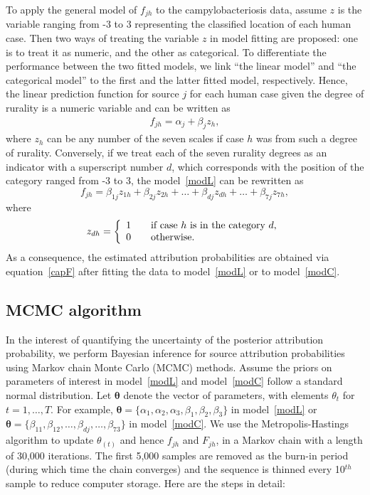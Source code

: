 \documentclass[AMA,STIX1COL]{WileyNJD-v2}
\begin{document}
To apply the general model of $f_{jh}$ to the campylobacteriosis data, assume $z$ is the variable ranging from -3 to 3 representing the classified location of each human case. Then two ways of treating the variable $z$ in model fitting are proposed: one is to treat it as numeric, and the other as categorical. To differentiate the performance between the two fitted models, we link ``the linear model'' and ``the categorical model'' to the first and the latter fitted model, respectively. Hence, the linear prediction function for source $j$ for each human case given the degree of rurality is a numeric variable and can be written as
\begin{align}
  f_{jh} = \alpha_{j} + \beta_{j} z_{h},
  \label{modL}
\end{align}
where $z_{h}$ can be any number of the seven scales if case $h$ was from such a degree of rurality. Conversely, if we treat each of the seven rurality degrees as an indicator with a superscript number $d$, which corresponds with the position of the category ranged from -3 to 3, the model~\eqref{modL} can be rewritten as
\begin{equation}
  f_{jh} = \beta_{1j} z_{1h}+ \beta_{2j} z_{2h} + \ldots + \beta_{dj} z_{dh} + \ldots +  \beta_{7j} z_{7h},
  \label{modC}
\end{equation}
where
\begin{equation*}
z_{dh} =
\left\{\begin{array}{rcl}
1 && \mbox{if case $h$ is in the category $d$,} \notag \\ 0 && \mbox{otherwise}.
\end{array}\right.
\end{equation*}
As a consequence, the estimated attribution probabilities are obtained via equation~\eqref{capF} after fitting the data to model~\eqref{modL} or to model~\eqref{modC}.

\subsection{MCMC algorithm}
In the interest of quantifying the uncertainty of the posterior attribution probability, we perform Bayesian inference for source attribution probabilities using Markov chain Monte Carlo (MCMC) methods. Assume the priors on parameters of interest in model~\eqref{modL} and model~\eqref{modC} follow a standard normal distribution. Let $\boldsymbol{\theta}$ denote the vector of parameters, with elements $\theta_{t}$ for $t=1, \ldots, T$. For example, $\boldsymbol{\theta}=\{\alpha_1, \alpha_2, \alpha_3, \beta_1, \beta_2, \beta_3\}$ in model~\eqref{modL} or $\boldsymbol{\theta}=\{\beta_{11}, \beta_{12}, \ldots, \beta_{dj}, \ldots, \beta_{73}\}$ in model~\eqref{modC}. We use the Metropolis-Hastings algorithm to update $\theta_{(t)}$ and hence $f_{jh}$ and $ F_{jh}$, in a Markov chain with a length of 30,000 iterations. The first 5,000 samples are removed as the burn-in period (during which time the chain converges) and the sequence is thinned every 10$^{th}$ sample to reduce computer storage. Here are the steps in detail:
\end{document}
